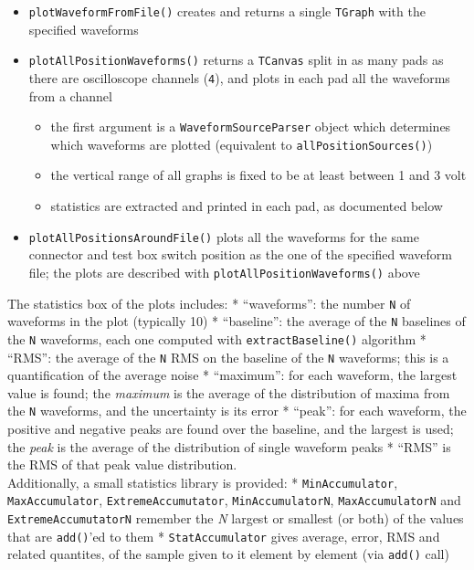 \begin{itemize}
\tightlist
\item
  \texttt{plotWaveformFromFile()} creates and returns a single
  \texttt{TGraph} with the specified waveforms
\item
  \texttt{plotAllPositionWaveforms()} returns a \texttt{TCanvas} split
  in as many pads as there are oscilloscope channels (\texttt{4}), and
  plots in each pad all the waveforms from a channel

  \begin{itemize}
  \tightlist
  \item
    the first argument is a \texttt{WaveformSourceParser} object which
    determines which waveforms are plotted (equivalent to
    \texttt{allPositionSources()})
  \item
    the vertical range of all graphs is fixed to be at least between 1
    and 3 volt
  \item
    statistics are extracted and printed in each pad, as documented
    below
  \end{itemize}
\item
  \texttt{plotAllPositionsAroundFile()} plots all the waveforms for the
  same connector and test box switch position as the one of the
  specified waveform file; the plots are described with
  \texttt{plotAllPositionWaveforms()} above
\end{itemize}

The statistics box of the plots includes: * ``waveforms'': the number
\texttt{N} of waveforms in the plot (typically 10) * ``baseline'': the
average of the \texttt{N} baselines of the \texttt{N} waveforms, each
one computed with \texttt{extractBaseline()} algorithm * ``RMS'': the
average of the \texttt{N} RMS on the baseline of the \texttt{N}
waveforms; this is a quantification of the average noise * ``maximum'':
for each waveform, the largest value is found; the \emph{maximum} is the
average of the distribution of maxima from the \texttt{N} waveforms, and
the uncertainty is its error * ``peak'': for each waveform, the positive
and negative peaks are found over the baseline, and the largest is used;
the \emph{peak} is the average of the distribution of single waveform
peaks * ``RMS'' is the RMS of that peak value distribution. \\

Additionally, a small statistics library is provided: *
\texttt{MinAccumulator}, \texttt{MaxAccumulator},
\texttt{ExtremeAccumutator}, \texttt{MinAccumulatorN},
\texttt{MaxAccumulatorN} and \texttt{ExtremeAccumutatorN} remember the
\emph{N} largest or smallest (or both) of the values that are
\texttt{add()}'ed to them * \texttt{StatAccumulator} gives average,
error, RMS and related quantites, of the sample given to it element by
element (via \texttt{add()} call) \\

